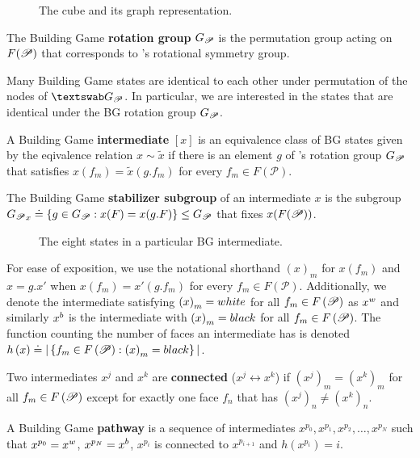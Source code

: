 \begin{figure}[ht]
\caption{The cube and its graph representation.}
\label{fig:CubeGraph}
\end{figure}

\begin{mydef}
The Building Game \textbf{rotation group} ${G_\mathscr{P}}$ is the permutation group acting on $F(\mathscr{P})$ that corresponds to \poly's rotational symmetry group.
\end{mydef}
Many Building Game states are identical to each other under permutation of the nodes of $\PolyGraph$. In particular, we are interested in the states that are identical under the BG rotation group ${G_\mathscr{P}}$.    
\begin{mydef}
A Building Game \textbf{intermediate} $[x]$ is an equivalence class of BG states given by the eqivalence relation  $x \sim \tilde{x}$ if there is an element $g$ of \poly's rotation group ${G_\mathscr{P}}$ that satisfies $x(f_m) = \tilde{x}(g.f_m)$ for every $f_m \in F(\mathscr{P})$. 
\end{mydef}
\begin{mydef}
The Building Game \textbf{stabilizer subgroup} of an intermediate $x$ is the subgroup ${G_\mathscr{P}}_x \doteq \left\{g \in {G_\mathscr{P}} : x(F) = x(g.F) \right\} \leq {G_\mathscr{P}}$ that fixes $x(F(\mathscr{P}))$.
\end{mydef}

\begin{figure}[ht]
\caption{The eight states in a particular BG intermediate.}
\label{fig:CubeState}
\end{figure}

For ease of exposition, we use the notational shorthand $\left(x\right)_m$ for $x\left(f_m\right)$ and $x = g.x'$ when $x(f_m) = x'(g.f_m)$ for every $f_m \in F(\mathscr{P})$. Additionally, we denote the intermediate satisfying $\left(x\right)_m = white$ for all $f_m \in F\left(\mathscr{P}\right)$ as $x^w$ and similarly $x^b$ is the intermediate with $\left(x\right)_m = black$ for all $f_m \in F\left(\mathscr{P}\right)$. The function counting the number of \spc faces an intermediate has is denoted $h\left(x\right) \doteq |\left\{f_m \in F\left(\mathscr{P}\right) : \left(x\right)_m = black\right\}|$.

\begin{mydef}
Two intermediates $x^j$ and $x^k$ are \textbf{connected} ($x^j \leftrightarrow x^k$) if $\left(x^j\right)_m = \left(x^k\right)_m$ for all $f_m \in F\left(\mathscr{P}\right)$ except for exactly one face $f_n$ that has  $\left(x^j\right)_n \neq \left(x^k\right)_n$.
\end{mydef}
\begin{mydef}
A Building Game \textbf{pathway} is a sequence of intermediates $x^{p_0}, x^{p_1}, x^{p_2}, \dots, x^{p_N}$ such that $x^{p_0} = x^w$, $x^{p_N} = x^b$, $x^{p_i}$ is connected to $x^{p_{i+1}}$ and $h\left(x^{p_i}\right) = i$.
\end{mydef}

